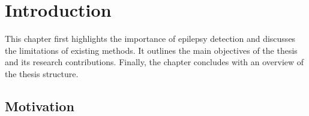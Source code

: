 \documentclass[FCD_GNN.tex]{subfiles}
\begin{document}
\chapter{Introduction}

This chapter first highlights the importance of epilepsy detection and discusses the limitations of existing methods. 
It outlines the main objectives of the thesis and its research contributions. 
Finally, the chapter concludes with an overview of the thesis structure.

\section{Motivation}


\end{document}
